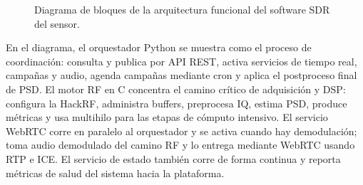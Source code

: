 \begin{figure}[htbp]
\caption{Diagrama de bloques de la arquitectura funcional del software SDR del sensor.}
\label{fig:arquitectura-software-sdr}
\end{figure}

En el diagrama, el orquestador Python se muestra como el proceso de coordinación:
consulta y publica por API REST, activa servicios de tiempo real, campañas y
audio, agenda campañas mediante cron y aplica el postproceso final de PSD. El
motor RF en C concentra el camino crítico de adquisición y DSP: configura la
HackRF, administra buffers, preprocesa IQ, estima PSD, produce métricas y usa
multihilo para las etapas de cómputo intensivo. El servicio WebRTC corre en
paralelo al orquestador y se activa cuando hay demodulación; toma audio
demodulado del camino RF y lo entrega mediante WebRTC usando RTP e ICE. El
servicio de estado también corre de forma continua y reporta métricas de salud
del sistema hacia la plataforma.

